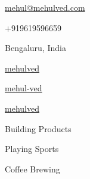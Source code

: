 \documentclass[11pt]{spidercv}
\begin{document}
    \begin{TopBar}{\ColorTextSide}

        \begin{DoubleColumns}
            \begin{ItemList}{\ColorHighlight}
                \item [\Large\faAt] \href{mailto:mehul@mehulved.com}{mehul@mehulved.com}
                \item [\Large\faMobile] +919619596659
                \item [\Large\faMapMarker] Bengaluru, India
            \end{ItemList}
            \nextcolumn
            \begin{ItemList}{\ColorHighlight}
                \item [\Large\faGithub] \href{https://github.com/mehulved}{mehulved}
                \item [\Large\faLinkedinSquare] \href{https://www.linkedin.com/mehul-ved}{mehul-ved}
                \item[\Large\faTwitter] \href{https://twitter.com/mehulved}{mehulved}
            \end{ItemList}
        \end{DoubleColumns}

        \begin{TripleColumns}
            \begin{ItemList}{\ColorHighlight}
                \item [] Building Products
            \end{ItemList}
            \nextcolumn
            \begin{ItemList}{\ColorHighlight}
                \item [] Playing Sports
            \end{ItemList}
            \nextcolumn
            \begin{ItemList}{\ColorHighlight}
                \item [] Coffee Brewing
            \end{ItemList}
        \end{TripleColumns}
    \end{TopBar}
\end{document}
